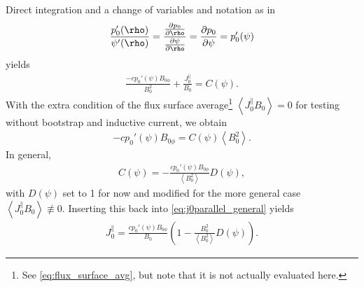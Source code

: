 Direct integration and a change of variables and notation as in
\begin{gather}
  \frac{p_{0}'(\rho)}{\psi'(\rho)} = \frac{\pd[p_{0}]{\rho}}{\pd[\psi]{\rho}} = \pd[p_{0}]{\psi} = p_{0}'(\psi)
\end{gather}
yields
\begin{gather}
  \frac{-c p_{0}' (\psi) B_{0 \phi}}{B_{0}^{2}} + \frac{J_{0}^{\parallel}}{B_{0}} = C(\psi). \label{eq:j0parallel_general}
\end{gather}
With the extra condition of the flux surface average\footnote{See \cref{eq:flux_surface_avg}, but note that it is not actually evaluated here.} $\left\langle J_{0}^{\parallel} B_{0} \right\rangle = 0$ for testing without bootstrap and inductive current, we obtain
\begin{gather}
  -c p_{0}'(\psi) B_{0 \phi} = C(\psi) \left\langle B_{0}^{2} \right\rangle.
\end{gather}
In general, 
\begin{gather}
  C(\psi) = -\frac{c p_{0}'(\psi) B_{0 \phi}}{\left\langle B_{0}^{2} \right\rangle} D(\psi),
\end{gather}
with $D(\psi)$ set to 1 for now and modified for the more general case $\left\langle J_{0}^{\parallel} B_{0} \right\rangle \not\equiv 0$. Inserting this back into \cref{eq:j0parallel_general} yields
\begin{gather}
  J_{0}^{\parallel} = \frac{c p_{0}'(\psi) B_{0 \phi}}{B_{0}} \left( 1 - \frac{B_{0}^{2}}{\left\langle B_{0}^{2} \right\rangle} D(\psi) \right).
\end{gather}

